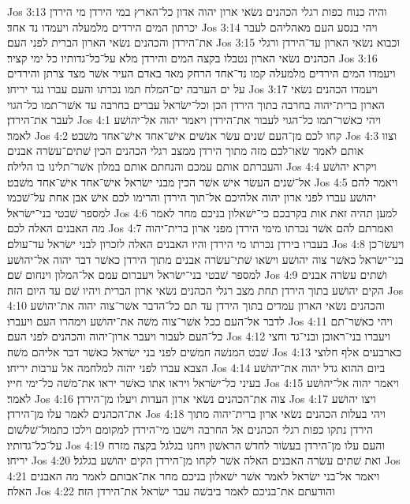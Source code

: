 Jos 3:13  והיה כנוח כפות רגלי הכהנים נשׂאי ארון יהוה אדון כל־הארץ במי הירדן מי הירדן יכרתון המים הירדים מלמעלה ויעמדו נד אחד׃
Jos 3:14  ויהי בנסע העם מאהליהם לעבר את־הירדן והכהנים נשׂאי הארון הברית לפני העם׃
Jos 3:15  וכבוא נשׂאי הארון עד־הירדן ורגלי הכהנים נשׂאי הארון נטבלו בקצה המים והירדן מלא על־כל־גדותיו כל ימי קציר׃
Jos 3:16  ויעמדו המים הירדים מלמעלה קמו נד־אחד הרחק מאד באדם העיר אשׁר מצד צרתן והירדים על ים הערבה ים־המלח תמו נכרתו והעם עברו נגד יריחו׃
Jos 3:17  ויעמדו הכהנים נשׂאי הארון ברית־יהוה בחרבה בתוך הירדן הכן וכל־ישׂראל עברים בחרבה עד אשׁר־תמו כל־הגוי לעבר את־הירדן׃
Jos 4:1  ויהי כאשׁר־תמו כל־הגוי לעבור את־הירדן ויאמר יהוה אל־יהושׁע לאמר׃
Jos 4:2  קחו לכם מן־העם שׁנים עשׂר אנשׁים אישׁ־אחד אישׁ־אחד משׁבט׃
Jos 4:3  וצוו אותם לאמר שׂאו־לכם מזה מתוך הירדן ממצב רגלי הכהנים הכין שׁתים־עשׂרה אבנים והעברתם אותם עמכם והנחתם אותם במלון אשׁר־תלינו בו הלילה׃
Jos 4:4  ויקרא יהושׁע אל־שׁנים העשׂר אישׁ אשׁר הכין מבני ישׂראל אישׁ־אחד אישׁ־אחד משׁבט׃
Jos 4:5  ויאמר להם יהושׁע עברו לפני ארון יהוה אלהיכם אל־תוך הירדן והרימו לכם אישׁ אבן אחת על־שׁכמו למספר שׁבטי בני־ישׂראל׃
Jos 4:6  למען תהיה זאת אות בקרבכם כי־ישׁאלון בניכם מחר לאמר מה האבנים האלה לכם׃
Jos 4:7  ואמרתם להם אשׁר נכרתו מימי הירדן מפני ארון ברית־יהוה בעברו בירדן נכרתו מי הירדן והיו האבנים האלה לזכרון לבני ישׂראל עד־עולם׃
Jos 4:8  ויעשׂו־כן בני־ישׂראל כאשׁר צוה יהושׁע וישׂאו שׁתי־עשׂרה אבנים מתוך הירדן כאשׁר דבר יהוה אל־יהושׁע למספר שׁבטי בני־ישׂראל ויעברום עמם אל־המלון וינחום שׁם׃
Jos 4:9  ושׁתים עשׂרה אבנים הקים יהושׁע בתוך הירדן תחת מצב רגלי הכהנים נשׂאי ארון הברית ויהיו שׁם עד היום הזה׃
Jos 4:10  והכהנים נשׂאי הארון עמדים בתוך הירדן עד תם כל־הדבר אשׁר־צוה יהוה את־יהושׁע לדבר אל־העם ככל אשׁר־צוה משׁה את־יהושׁע וימהרו העם ויעברו׃
Jos 4:11  ויהי כאשׁר־תם כל־העם לעבור ויעבר ארון־יהוה והכהנים לפני העם׃
Jos 4:12  ויעברו בני־ראובן ובני־גד וחצי שׁבט המנשׁה חמשׁים לפני בני ישׂראל כאשׁר דבר אליהם משׁה׃
Jos 4:13  כארבעים אלף חלוצי הצבא עברו לפני יהוה למלחמה אל ערבות יריחו׃
Jos 4:14  ביום ההוא גדל יהוה את־יהושׁע בעיני כל־ישׂראל ויראו אתו כאשׁר יראו את־משׁה כל־ימי חייו׃
Jos 4:15  ויאמר יהוה אל־יהושׁע לאמר׃
Jos 4:16  צוה את־הכהנים נשׂאי ארון העדות ויעלו מן־הירדן׃
Jos 4:17  ויצו יהושׁע את־הכהנים לאמר עלו מן־הירדן׃
Jos 4:18  ויהי בעלות הכהנים נשׂאי ארון ברית־יהוה מתוך הירדן נתקו כפות רגלי הכהנים אל החרבה וישׁבו מי־הירדן למקומם וילכו כתמול־שׁלשׁום על־כל־גדותיו׃
Jos 4:19  והעם עלו מן־הירדן בעשׂור לחדשׁ הראשׁון ויחנו בגלגל בקצה מזרח יריחו׃
Jos 4:20  ואת שׁתים עשׂרה האבנים האלה אשׁר לקחו מן־הירדן הקים יהושׁע בגלגל׃
Jos 4:21  ויאמר אל־בני ישׂראל לאמר אשׁר ישׁאלון בניכם מחר את־אבותם לאמר מה האבנים האלה׃
Jos 4:22  והודעתם את־בניכם לאמר ביבשׁה עבר ישׂראל את־הירדן הזה׃

